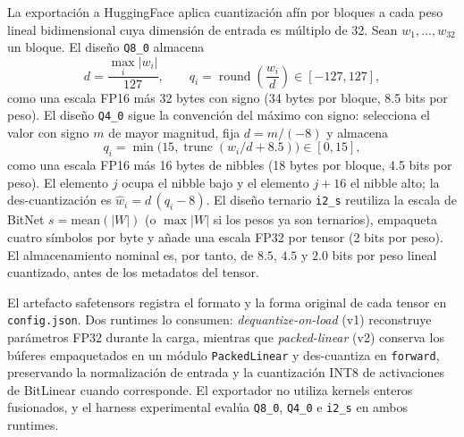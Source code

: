 La exportación a HuggingFace aplica cuantización afín por bloques a cada peso lineal bidimensional cuya dimensión de entrada es múltiplo de 32. Sean $w_1,\ldots,w_{32}$ un bloque. El diseño \texttt{Q8\_0} almacena
\[
d=\frac{\max_i |w_i|}{127},\qquad q_i=\operatorname{round}\!\left(\frac{w_i}{d}\right)\in[-127,127],
\]
como una escala FP16 más 32 bytes con signo (34 bytes por bloque, 8.5 bits por peso). El diseño \texttt{Q4\_0} sigue la convención del máximo con signo: selecciona el valor con signo $m$ de mayor magnitud, fija $d=m/(-8)$ y almacena
\[
q_i=\min\!\bigl(15,\operatorname{trunc}(w_i/d+8.5)\bigr)\in[0,15],
\]
como una escala FP16 más 16 bytes de nibbles (18 bytes por bloque, 4.5 bits por peso). El elemento $j$ ocupa el nibble bajo y el elemento $j+16$ el nibble alto; la des-cuantización es $\hat w_i=d\,(q_i-8)$. El diseño ternario \texttt{i2\_s} reutiliza la escala de BitNet $s=\text{mean}(|W|)$ (o $\max|W|$ si los pesos ya son ternarios), empaqueta cuatro símbolos por byte y añade una escala FP32 por tensor (2 bits por peso). El almacenamiento nominal es, por tanto, de $8.5$, $4.5$ y $2.0$ bits por peso lineal cuantizado, antes de los metadatos del tensor.

El artefacto safetensors registra el formato y la forma original de cada tensor en \texttt{config.json}. Dos runtimes lo consumen: \emph{dequantize-on-load} (v1) reconstruye parámetros FP32 durante la carga, mientras que \emph{packed-linear} (v2) conserva los búferes empaquetados en un módulo \texttt{PackedLinear} y des-cuantiza en \texttt{forward}, preservando la normalización de entrada y la cuantización INT8 de activaciones de BitLinear cuando corresponde. El exportador no utiliza kernels enteros fusionados, y el harness experimental evalúa \texttt{Q8\_0}, \texttt{Q4\_0} e \texttt{i2\_s} en ambos runtimes.

